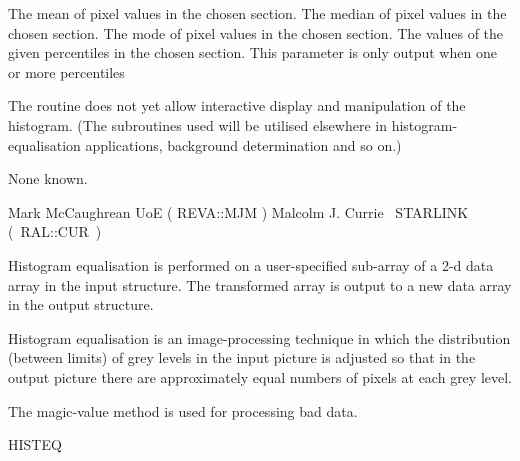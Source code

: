 {\begin{manroutinedescription}
\begin{manparametertable}
  The mean of pixel values in the chosen section.
  The median of pixel values in the chosen section.
  The mode of pixel values in the chosen section.
  The values of the given percentiles in the chosen section.
  This parameter is only output when one or more percentiles
\end{manparametertable}
  The routine does not yet allow interactive display and
  manipulation of the histogram. (The subroutines used will be
  utilised elsewhere in histogram-equalisation applications,
  background determination and so on.)

  None known.

  Mark McCaughrean UoE ( {\mantt REVA}::{\mantt MJM} )
  Malcolm J. Currie ~STARLINK \mbox{( {\mantt RAL}::{\mantt CUR} )}
\end{manroutinedescription}

\begin{manroutinedescription}
  Histogram equalisation is performed on a user-specified
  sub-array of a 2-d data array in the input {} structure. The
  transformed array is output to a new data array in the output
  {} structure.

  Histogram equalisation is an image-processing technique in which
  the distribution (between limits) of grey levels in the input
  picture is adjusted so that in the output picture there are
  approximately equal numbers of pixels at each grey level.

  The magic-value method is used for processing bad data.

  HISTEQ


\end{manroutinedescription}}
